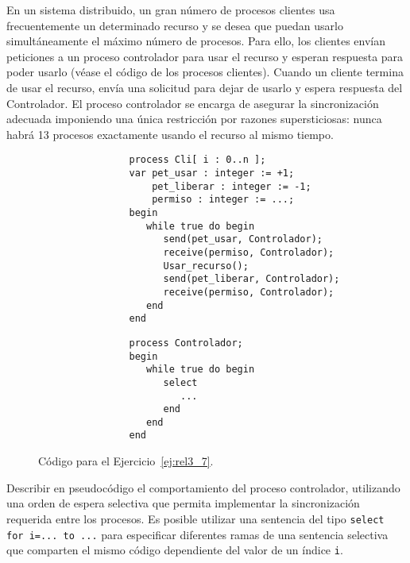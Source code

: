 \begin{ejercicio}\label{ej:rel3_7}
    En un sistema distribuido, un gran número de procesos clientes usa frecuentemente un determinado recurso y se desea que puedan usarlo simultáneamente el máximo número de procesos. Para ello, los clientes envían peticiones a un proceso controlador para usar el recurso y esperan respuesta para poder usarlo (véase el código de los procesos clientes). Cuando un cliente termina de usar el recurso, envía una solicitud para dejar de usarlo y espera respuesta del Controlador. El proceso controlador se encarga de asegurar la sincronización adecuada imponiendo una única restricción por razones supersticiosas: nunca habrá 13 procesos exactamente usando el recurso al mismo tiempo.
    \begin{figure}[H]
        \centering
        \setlength{\columnsep}{1cm}
        \begin{multicols}{2}
            \begin{verbatim}
                process Cli[ i : 0..n ];
                var pet_usar : integer := +1;
                    pet_liberar : integer := -1;
                    permiso : integer := ...;
                begin
                   while true do begin
                      send(pet_usar, Controlador);
                      receive(permiso, Controlador);
                      Usar_recurso();
                      send(pet_liberar, Controlador);
                      receive(permiso, Controlador);
                   end
                end
            \end{verbatim}
            \begin{verbatim}
                process Controlador;
                begin
                   while true do begin
                      select
                         ...
                      end
                   end
                end
            \end{verbatim}
        \end{multicols}
        \caption{Código para el Ejercicio~\ref{ej:rel3_7}.}
        \label{fig:cod_7}
    \end{figure}
    Describir en pseudocódigo el comportamiento del proceso controlador, utilizando una orden de espera selectiva que permita implementar la sincronización requerida entre los procesos. Es posible utilizar una sentencia del tipo \verb|select for i=... to ...| para especificar diferentes ramas de una sentencia selectiva que comparten el mismo código dependiente del valor de un índice \verb|i|.\\


\end{ejercicio}
